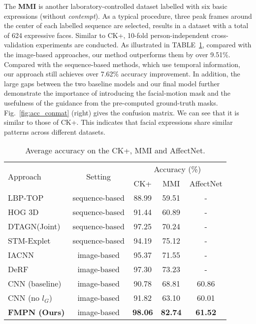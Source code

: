 \documentclass[conference,a4paper]{IEEEtran}
\begin{document}
The \textbf{MMI} \cite{pantic2005web} is another laboratory-controlled dataset labelled with six basic expressions (without \textit{contempt}). As a typical procedure, three peak frames around the center of each labelled sequence are selected, results in a dataset with a total of 624 expressive faces. Similar to CK+, 10-fold person-independent cross-validation experiments are conducted.
As illustrated in TABLE~\ref{tab:ckp_acc}, compared with the image-based approaches, our method outperforms them by over 9.51\%. Compared with the sequence-based methods, which use temporal information, our approach still achieves over 7.62\% accuracy improvement. In addition, the large gaps between the two baseline models and our final model further demonstrate the importance of introducing the facial-motion mask and the usefulness of the guidance from the pre-computed ground-truth masks. Fig.~\ref{fig:acc_conmat} (right) gives the confusion matrix. We can see that it is similar to those of CK+. This indicates that facial expressions share similar patterns across different datasets.


















\begin{table}[!t]
\caption{Average accuracy on the CK+, MMI and AffectNet.}
\label{tab:ckp_acc}
\centering
\begin{tabular}{@{}lcccc@{}}
\toprule
\multirow{2}{*}{Approach} & \multirow{2}{*}{Setting} & \multicolumn{3}{c}{Accuracy (\%)} \\ \cmidrule(l){3-5} 
&  & CK+ & MMI  & AffectNet      \\ \midrule
LBP-TOP~\cite{zhao2007dynamic}      & sequence-based    & 88.99          & 59.51           &   -     \\ 
HOG 3D~\cite{klaser2008spatio}      & sequence-based    & 91.44          & 60.89           &   -     \\ 
DTAGN(Joint)~\cite{jung2015joint}   & sequence-based    & 97.25          & 70.24           &   -     \\ 
STM-Explet~\cite{liu2014learning}   & sequence-based    & 94.19          & 75.12           &   -     \\ 
IACNN~\cite{meng2017identity}       & image-based       & 95.37          & 71.55           &   -     \\ 
DeRF~\cite{yang2018facial}          & image-based       & 97.30          & 73.23           &   -     \\ \midrule
CNN (baseline)                      & image-based       & 90.78          & 68.81           & 60.86   \\
CNN (no $l_G$)                      & image-based       & 91.82          & 63.10           & 60.01   \\ 
\textbf{FMPN (Ours)}                & image-based       & \textbf{98.06} & \textbf{82.74}  & \textbf{61.52} \\ \bottomrule
\end{tabular}
\end{table}
\end{document}

